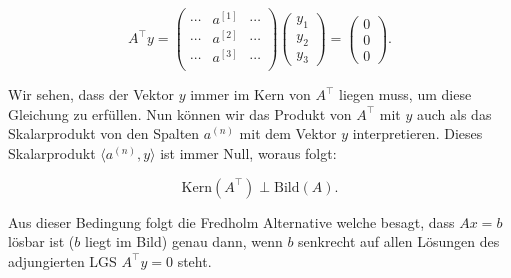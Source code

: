 \begin{equation*}
    A^\top y = \begin{pmatrix}
        \cdots & a^{[1]} & \cdots \\
        \cdots & a^{[2]} & \cdots \\
        \cdots & a^{[3]} & \cdots \\
    \end{pmatrix} \begin{pmatrix}
        y_1 \\ y_2 \\ y_3
    \end{pmatrix} = \begin{pmatrix}
        0 \\ 0 \\ 0
    \end{pmatrix}.
\end{equation*}

Wir sehen, dass der Vektor \( y \) immer im Kern von \( A^\top \) liegen muss, um diese Gleichung zu erfüllen. Nun können wir das Produkt von \( A^\top \) mit \( y \) auch als das Skalarprodukt von den Spalten \( a^{(n)} \) mit dem Vektor \( y \) interpretieren. Dieses Skalarprodukt \( \langle a^{(n)}, y \rangle \) ist immer Null, woraus folgt:

\begin{equation*}
    \text{Kern}(A^\top) \perp \text{Bild}(A).
\end{equation*}

Aus dieser Bedingung folgt die Fredholm Alternative welche besagt, dass \( Ax = b \) lösbar ist (\(b \) liegt im Bild) genau dann, wenn \( b \) senkrecht auf allen Lösungen des adjungierten LGS \( A^\top y = 0 \) steht.
